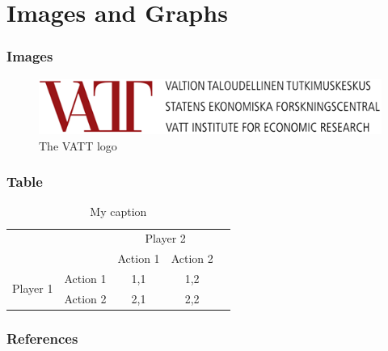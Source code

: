 \documentclass{beamer}
\begin{document}
\section{Images and Graphs}
\begin{frame}
\frametitle{Images}
\begin{figure}
  \includegraphics[width=0.8\linewidth]{Logo.png}
  \caption{The VATT logo}
  \label{fig:logo}
\end{figure}
\end{frame}

\begin{frame}
\frametitle{Table}
\begin{table}[]
\centering
\caption{My caption}
\label{my-label}
\begin{tabular}{ccccc}
\multicolumn{2}{l}{\multirow{2}{*}{}} & \multicolumn{2}{c}{Player 2} &  \\
\multicolumn{2}{l}{}                  & Action 1      & Action 2     &  \\\hline
\multirow{2}{*}{Player 1}  & Action 1 \vline & 1,1           & 1,2          &  \\
                           & Action 2 \vline & 2,1           & 2,2          & 
\end{tabular}
\end{table}
\end{frame}

\ThankYouFrame

\begin{frame}
\frametitle{References}


\end{frame}
\end{document}
